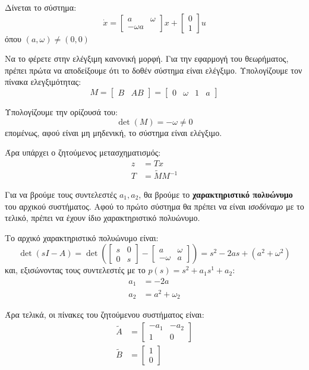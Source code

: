 \documentclass[11pt,a4paper,notitlepage,fleqn]{article}
\let\mytodo\todo
\renewcommand{\todo}[1]{\par\mytodo[inline,noline]{#1}}
\begin{document}
\begin{exercise}[Παράδειγμα]
	Δίνεται το σύστημα: \[
	\dot x = \left[\begin{matrix}
	a & \omega \\ -\omega  a
	\end{matrix}\right]x + \left[\begin{matrix}
	0 \\ 1
	\end{matrix}\right]u
	\] όπου \( (a,\omega ) \neq (0,0) \)
	
	Να το φέρετε στην ελέγξιμη κανονική μορφή.
	\tcblower
	Για την εφαρμογή του θεωρήματος, πρέπει πρώτα να αποδείξουμε ότι το
	δοθέν σύστημα είναι ελέγξιμο.
	Υπολογίζουμε τον πίνακα ελεγξιμότητας:
	\[
	M=\left[\begin{matrix}
	B & AB
	\end{matrix}\right] = \left[\begin{matrix}
	0 & \omega & 1 & a
	\end{matrix}\right]
	\]
	
	Υπολογίζουμε την ορίζουσά του:
	\[
	\det(M) = -\omega  \neq 0
	\]
	επομένως, αφού είναι μη μηδενική, το σύστημα είναι ελέγξιμο.
	\todo{really?}
	
	Άρα υπάρχει ο ζητούμενος μετασχηματισμός:
	\begin{align*}
		z &= Tx \\
		T &= \tilde M M^{-1}
	\end{align*}
	
	Για να βρούμε τους συντελεστές \( a_1, a_2 \), θα βρούμε το
	\textbf{χαρακτηριστικό πολυώνυμο} του αρχικού συστήματος. Αφού το πρώτο
	σύστημα θα πρέπει να είναι \textit{ισοδύναμο} με το τελικό, πρέπει
	να έχουν ίδιο χαρακτηριστικό πολυώνυμο.
	
	Το αρχικό χαρακτηριστικό πολυώνυμο είναι:
	\[
	\det(sI-A) = \det\left(
	\left[\begin{matrix}
	s & 0 \\ 0 & s
	\end{matrix}\right]-\left[\begin{matrix}
	a & \omega  \\ -\omega &a
	\end{matrix}\right]
	\right) = s^2-2as + (a^2+\omega^2)
	\]
	και, εξισώνοντας τους συντελεστές με το \( p(s) = s^2 + a_1s^1 + a_2 \):
	\begin{align*}
		a_1 &= -2a \\
		a_2 &= a^2+\omega_2
	\end{align*}
	
	Άρα τελικά, οι πίνακες του ζητούμενου συστήματος είναι:
	\begin{align*}
		\tilde A &= \left[\begin{matrix}
		-a_1 & -a_2 \\ 1 & 0
		\end{matrix}\right] \\
		\tilde B &= \left[\begin{matrix}
		1 \\ 0
		\end{matrix}\right]
	\end{align*}
	

\end{exercise}
\end{document}
